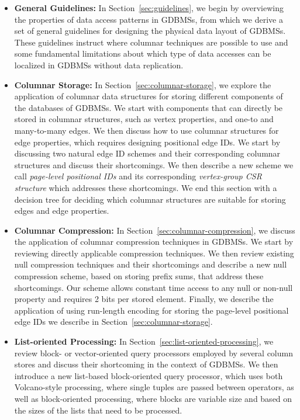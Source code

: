 \begin{itemize}
	\item {\bf General Guidelines:} In Section~\ref{sec:guidelines}, we begin by overviewing the properties of data access patterns in GDBMSs, from which we derive a set of general guidelines for designing the physical data layout of GDBMSs. These guidelines instruct where columnar techniques are possible to use and some fundamental limitations about which type of data accesses can be localized in GDBMSs without data replication.
	\item {\bf Columnar Storage:} In Section~\ref{sec:columnar-storage}, we explore  the application of columnar data structures for storing different components of the databases of GDBMSs. We start with components that can directly be stored in columnar structures, such as vertex properties, and one-to and many-to-many edges. We then discuss how to use columnar structures for edge properties, which requires designing positional edge IDs. We start by discussing two natural edge ID schemes and their corresponding columnar structures and discuss their shortcomings. We then describe a new scheme we call {\em page-level positional IDs} and its corresponding {\em vertex-group CSR structure} which addresses these shortcomings. We end this section with a decision tree for deciding which columnar structures are suitable for storing edges and edge properties.  
	\item {\bf Columnar Compression:} In Section~\ref{sec:columnar-compression}, we discuss the application of columnar compression techniques in GDBMSs. We start by reviewing directly applicable compression techniques. We then review existing null compression techniques and their shortcomings and describe a new null compression scheme, based on storing prefix sums, that address these shortcomings. Our scheme allows constant time access to any null or non-null property and requires 2 bits per stored element. Finally, we describe the application of using run-length encoding for storing the page-level positional edge IDs we describe in Section~\ref{sec:columnar-storage}. 
	\item {\bf List-oriented Processing:} In Section~\ref{sec:list-oriented-processing}, we review block- or vector-oriented query processors employed by several column stores and discuss their shortcoming in the context of GDBMSs. We then introduce a new list-based block-oriented query processor, which uses both Volcano-style processing, where single tuples are passed between operators, as well as block-oriented processing, where blocks are variable size and based on the sizes of the lists that need to be processed. 
	

\end{itemize}
